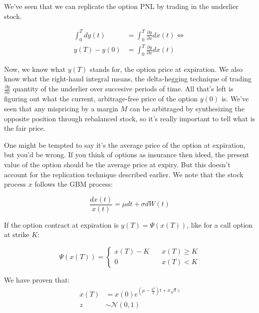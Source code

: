 \documentclass{article}
\begin{document}
We've seen that we can replicate the option PNL by trading in the underlier stock.

\begin{equation}
  \begin{aligned}
    \int_{0}^{T} d y(t) &= \int_{0}^{T} \frac{\partial y}{\partial x} dx(t) \Leftrightarrow \\
    y(T) - y(0) &= \int_{0}^{T} \frac{\partial y}{\partial x} dx(t)
  \end{aligned}
\end{equation}

Now, we know what $y(T)$ stands for, the option price at expiration. We also know what the right-hand integral means, the delta-hegging technique of trading $\frac{\partial y}{\partial x}$ quantity of the underlier over succesive periods of time. All that's left is figuring out what the current, arbitrage-free price of the option $y(0)$ is. We've seen that any mispricing by a margin $M$ can be arbitraged by synthesizing the opposite position through rebalanced stock, so it's really important to tell what is the fair price.

One might be tempted to say it's the average price of the option at expiration, but you'd be wrong. If you think of options as insurance then ideed, the present value of the option should be the average price at expiry. But this doesn't account for the replication technique described earlier. We note that the stock process $x$ follows the GBM process:

\begin{equation}
    \frac{dx(t)}{x(t)} = \mu dt + \sigma dW(t)
\end{equation}

If the option contract at expiration is $y(T) = \Psi \left( x(T) \right)$, like for a call option at strike $K$:

\begin{equation}
  \Psi \left( x(T) \right)= \left\{
        \begin{array}{ll}
            x(T) - K & \quad x(T) \geq K \\
            0 & \quad x(T) < K
        \end{array}
    \right.
\end{equation}

We have proven that:
\begin{equation}
  \begin{aligned}
    x(T) & = x(0) e^{\left( \mu - \frac{{\sigma}^2 }{2} \right) t + \sigma \sqrt{t} z} \\
    z & \sim \mathcal{N}(0,1)
  \end{aligned}
\end{equation}
\end{document}
